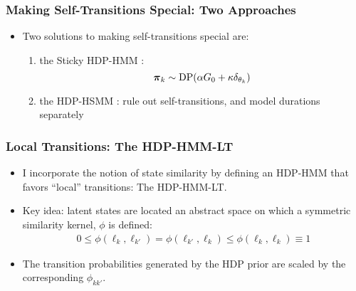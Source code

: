 \documentclass[11pt, serif, mathserif, table,trans]{beamer}
\begin{document}
\begin{frame}
  \frametitle{Making Self-Transitions Special: Two Approaches}
  \begin{itemize}[<+->]
  \item Two solutions to making self-transitions special are:
    \begin{enumerate}
      \item the Sticky HDP-HMM \cite{fox2008hdp}:
        \begin{equation}
          \label{eq:13}
          \boldsymbol{\pi}_k \sim \mathrm{DP}(\alpha G_0 + \kappa \delta_{\theta_k})
        \end{equation}
      \item the HDP-HSMM \cite{johnson2013bayesian}: rule out
        self-transitions, and model durations separately
      \end{enumerate}
    \end{itemize}
\end{frame}

\begin{frame}
  \frametitle{Local Transitions: The HDP-HMM-LT}
  \begin{itemize}[<+->]
  \item I incorporate the notion of state similarity by defining an
    HDP-HMM that favors ``local'' transitions: The HDP-HMM-LT.
  \item Key idea: latent states are located an abstract space 
    on which a symmetric similarity kernel, $\phi$ is defined:
    \begin{align}
      0 \leq \phi(\ell_k, \ell_{k'}) = \phi(\ell_{k'}, \ell_k) \leq \phi(\ell_k, \ell_k) \equiv 1
    \end{align}
  \item The transition probabilities generated by the HDP prior are
    scaled by the corresponding $\phi_{kk'}$.
  \end{itemize}
\end{frame}
\end{document}
